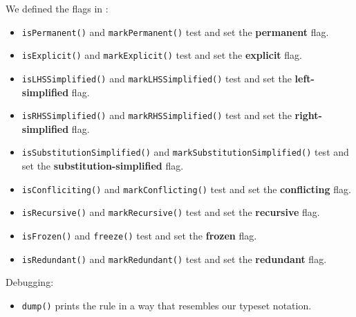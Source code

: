 \documentclass[../generics]{subfiles}
\begin{document}
We defined the flags in :
\begin{itemize}
\item \texttt{isPermanent()} and \texttt{markPermanent()} test and set the \textbf{permanent} flag.
\item \texttt{isExplicit()} and \texttt{markExplicit()} test and set the \textbf{explicit} flag.
\item \texttt{isLHSSimplified()} and \texttt{markLHSSimplified()} test and set the \textbf{left-simplified} flag.
\item \texttt{isRHSSimplified()} and \texttt{markRHSSimplified()} test and set the \textbf{right-simplified} flag.
\item \texttt{isSubstitutionSimplified()} and \texttt{markSubstitutionSimplified()} test and set the \textbf{substitution-simplified} flag.
\item \texttt{isConfliciting()} and \texttt{markConflicting()} test and set the \textbf{conflicting} flag.
\item \texttt{isRecursive()} and \texttt{markRecursive()} test and set the \textbf{recursive} flag.
\item \texttt{isFrozen()} and \texttt{freeze()} test and set the \textbf{frozen} flag.
\item \texttt{isRedundant()} and \texttt{markRedundant()} test and set the \textbf{redundant} flag.
\end{itemize}
Debugging:
\begin{itemize}
\item \texttt{dump()} prints the rule in a way that resembles our typeset notation.
\end{itemize}
\end{document}
